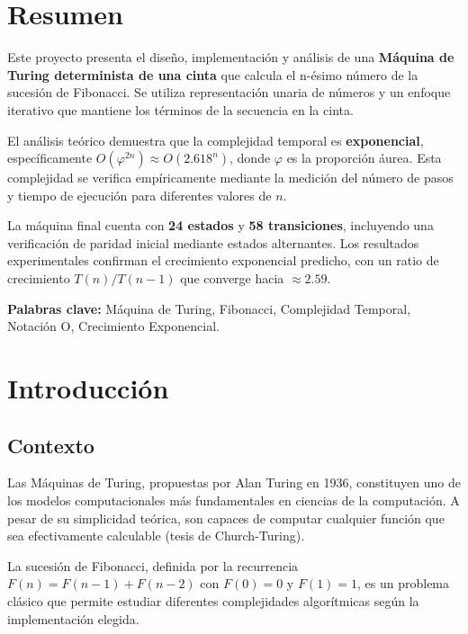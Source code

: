 \documentclass[12pt,a4paper]{article}
\begin{document}
\section*{Resumen}

Este proyecto presenta el diseño, implementación y análisis de una \textbf{Máquina de Turing determinista de una cinta} que calcula el n-ésimo número de la sucesión de Fibonacci. Se utiliza representación unaria de números y un enfoque iterativo que mantiene los términos de la secuencia en la cinta.

El análisis teórico demuestra que la complejidad temporal es \textbf{exponencial}, específicamente $O(\varphi^{2n}) \approx O(2.618^n)$, donde $\varphi$ es la proporción áurea. Esta complejidad se verifica empíricamente mediante la medición del número de pasos y tiempo de ejecución para diferentes valores de $n$.

La máquina final cuenta con \textbf{24 estados} y \textbf{58 transiciones}, incluyendo una verificación de paridad inicial mediante estados alternantes. Los resultados experimentales confirman el crecimiento exponencial predicho, con un ratio de crecimiento $T(n)/T(n-1)$ que converge hacia $\approx 2.59$.

\textbf{Palabras clave:} Máquina de Turing, Fibonacci, Complejidad Temporal, Notación O, Crecimiento Exponencial.

\newpage

\section{Introducción}

\subsection{Contexto}

Las Máquinas de Turing, propuestas por Alan Turing en 1936, constituyen uno de los modelos computacionales más fundamentales en ciencias de la computación. A pesar de su simplicidad teórica, son capaces de computar cualquier función que sea efectivamente calculable (tesis de Church-Turing).

La sucesión de Fibonacci, definida por la recurrencia $F(n) = F(n-1) + F(n-2)$ con $F(0)=0$ y $F(1)=1$, es un problema clásico que permite estudiar diferentes complejidades algorítmicas según la implementación elegida.
\end{document}

